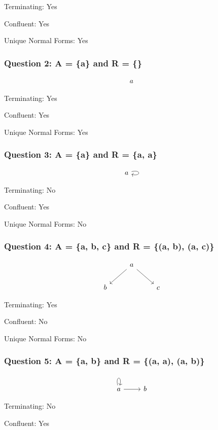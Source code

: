 \documentclass{article}
\theoremstyle{theorem}
\theoremstyle{definition}
\theoremstyle{remark}
\begin{document}
Terminating: Yes 

Confluent: Yes

Unique Normal Forms: Yes

\subsubsection*{Question 2: A = \{a\} and R = \{\}}

\[
\begin{tikzcd}
a
\end{tikzcd}
\]

Terminating: Yes

Confluent: Yes 

Unique Normal Forms: Yes

\subsubsection*{Question 3: A = \{a\} and R = \{a, a\}}

\[
\begin{tikzcd}
a \arrow[loop right]{}
\end{tikzcd}
\]

Terminating: No

Confluent: Yes 

Unique Normal Forms: No

\subsubsection*{Question 4: A = \{a, b, c\} and R = \{(a, b), (a, c)\}}

\[
\begin{tikzcd}
& a \arrow[ld] \arrow[rd] & \\
b & & c
\end{tikzcd}
\]

Terminating: Yes

Confluent: No

Unique Normal Forms: No

\subsubsection*{Question 5: A = \{a, b\} and R = \{(a, a), (a, b)\}}

\[
\begin{tikzcd}
a \arrow[loop above]{} \arrow[r] & b
\end{tikzcd}
\]

Terminating: No

Confluent: Yes
\end{document}
